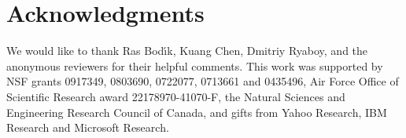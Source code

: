 \section*{Acknowledgments}
We would like to thank Ras Bod\'{\i}k, Kuang Chen, Dmitriy Ryaboy, and the
anonymous reviewers for their helpful comments. This work was supported by NSF
grants 0917349, 0803690, 0722077, 0713661 and 0435496, Air Force Office of
Scientific Research award 22178970-41070-F, the Natural Sciences and Engineering
Research Council of Canada, and gifts from Yahoo Research, IBM Research and
Microsoft Research.
